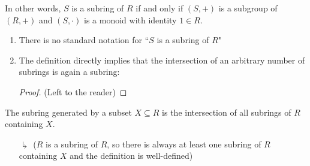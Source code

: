 \documentclass[12pt, a4paper, oneside, openright, titlepage]{book}
\begin{document}
\begin{rmk}
    In other words, $S$ is a subring of $R$ if and only if $(S,+)$ is a subgroup of $(R,+)$ and $(S,\cdot)$ is a monoid with identity $1 \in R$.
\end{rmk}

\begin{note}
    \leavevmode
    \begin{enumerate}
        \item There is no standard notation for ``$S$ is a subring of $R$"
        \item The definition directly implies that the intersection of an arbitrary number of subrings is again a subring:
        \begin{proof}
            (Left to the reader)
        \end{proof}
    \end{enumerate}
\end{note}

\begin{defn}
    The subring generated by a subset $X \subseteq R$ is the intersection of all subrings of $R$ containing $X$.
    \begin{enumerate}
        \item[$\drsh$] ($R$ is a subring of $R$, so there is always at least one subring of $R$ containing $X$ and the definition is well-defined)
    \end{enumerate}
\end{defn}
\end{document}
